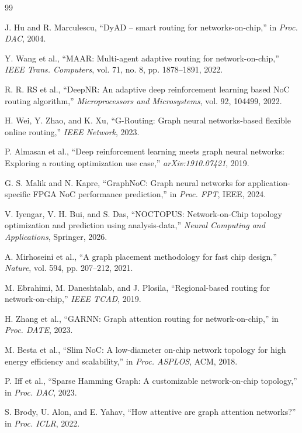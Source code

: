 \documentclass[conference]{IEEEtran}
\begin{document}
\begin{thebibliography}{99}

J. Hu and R. Marculescu, ``DyAD -- smart routing for networks-on-chip,'' in \textit{Proc. DAC}, 2004.

Y. Wang et al., ``MAAR: Multi-agent adaptive routing for network-on-chip,'' \textit{IEEE Trans. Computers}, vol. 71, no. 8, pp. 1878--1891, 2022.

R. R. RS et al., ``DeepNR: An adaptive deep reinforcement learning based NoC routing algorithm,'' \textit{Microprocessors and Microsystems}, vol. 92, 104499, 2022.

H. Wei, Y. Zhao, and K. Xu, ``G-Routing: Graph neural networks-based flexible online routing,'' \textit{IEEE Network}, 2023.

P. Almasan et al., ``Deep reinforcement learning meets graph neural networks: Exploring a routing optimization use case,'' \textit{arXiv:1910.07421}, 2019.

G. S. Malik and N. Kapre, ``GraphNoC: Graph neural networks for application-specific FPGA NoC performance prediction,'' in \textit{Proc. FPT}, IEEE, 2024.

V. Iyengar, V. H. Bui, and S. Das, ``NOCTOPUS: Network-on-Chip topology optimization and prediction using analysis-data,'' \textit{Neural Computing and Applications}, Springer, 2026.

A. Mirhoseini et al., ``A graph placement methodology for fast chip design,'' \textit{Nature}, vol. 594, pp. 207--212, 2021.

M. Ebrahimi, M. Daneshtalab, and J. Plosila, ``Regional-based routing for network-on-chip,'' \textit{IEEE TCAD}, 2019.

H. Zhang et al., ``GARNN: Graph attention routing for network-on-chip,'' in \textit{Proc. DATE}, 2023.

M. Besta et al., ``Slim NoC: A low-diameter on-chip network topology for high energy efficiency and scalability,'' in \textit{Proc. ASPLOS}, ACM, 2018.

P. Iff et al., ``Sparse Hamming Graph: A customizable network-on-chip topology,'' in \textit{Proc. DAC}, 2023.

S. Brody, U. Alon, and E. Yahav, ``How attentive are graph attention networks?'' in \textit{Proc. ICLR}, 2022.


\end{thebibliography}
\end{document}
